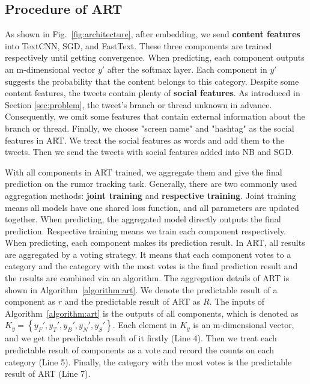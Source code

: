 \subsection{Procedure of ART}
As shown in Fig.~\ref{fig:architecture}, after embedding, we send \textbf{content features} into TextCNN, SGD, and FastText. These three components are trained respectively until getting convergence. When predicting, each component outputs an m-dimensional vector $y'$ after the softmax layer. Each component in $y'$ suggests the probability that the content belongs to this category. Despite some content features, the tweets contain plenty of \textbf{social features}. As introduced in Section \ref{sec:problem}, the tweet's branch or thread unknown in advance. Consequently, we omit some features that contain external information about the branch or thread. Finally, we choose "screen name" and "hashtag" as the social features in ART. We treat the social features as words and add them to the tweets. Then we send the tweets with social features added into NB and SGD. 

With all components in ART trained, we aggregate them and give the final prediction on the rumor tracking task. Generally, there are two commonly used aggregation methods: \textbf{joint training} and \textbf{respective training}. Joint training means all models have one shared loss function, and all parameters are updated together. When predicting, the aggregated model directly outputs the final prediction. Respective training means we train each component respectively. When predicting, each component makes its prediction result. In ART, all results are aggregated by a voting strategy. It means that each component votes to a category and the category with the most votes is the final prediction result and the results are combined via an algorithm. The aggregation details of ART is shown in Algorithm~\ref{algorithm:art}. We denote the predictable result of a component as $r$ and the predictable result of ART as $R$. The inputs of Algorithm~\ref{algorithm:art} is the outputs of all components, which is denoted as $K_y = \left\{y_F', y_T', y_B', y_N', y_S' \right\}$. Each element in $K_y$ is an m-dimensional vector, and we get the predictable result of it firstly (Line 4). Then we treat each predictable result of components as a vote and record the counts on each category (Line 5). Finally, the category with the most votes is the predictable result of ART (Line 7). 
